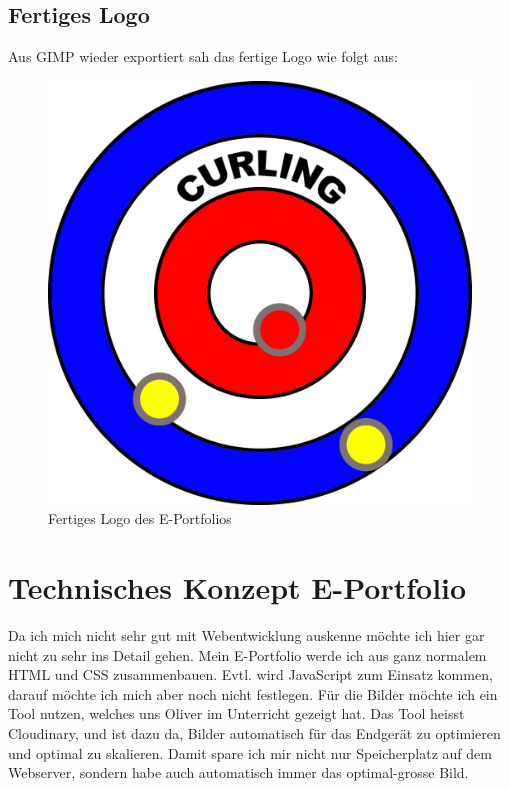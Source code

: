 \documentclass[11pt]{article}
\begin{document}
    \subsection{Fertiges Logo}
    Aus GIMP wieder exportiert sah das fertige Logo wie folgt aus:

    \begin{figure}[h]
        \includegraphics[width=\textwidth]{media/curling_logo}
        \caption{Fertiges Logo des E-Portfolios}
    \end{figure}

    \pagebreak

    \section{Technisches Konzept E-Portfolio}
    Da ich mich nicht sehr gut mit Webentwicklung auskenne möchte ich hier gar nicht zu sehr ins Detail gehen.
    Mein E-Portfolio werde ich aus ganz normalem HTML und CSS zusammenbauen. Evtl. wird JavaScript zum Einsatz kommen,
    darauf möchte ich mich aber noch nicht festlegen.
    Für die Bilder möchte ich ein Tool nutzen, welches uns Oliver im Unterricht gezeigt hat. Das Tool heisst Cloudinary,
    und ist dazu da, Bilder automatisch für das Endgerät zu optimieren und optimal zu skalieren. Damit spare ich mir
    nicht nur Speicherplatz auf dem Webserver, sondern habe auch automatisch immer das optimal-grosse Bild.
\end{document}
